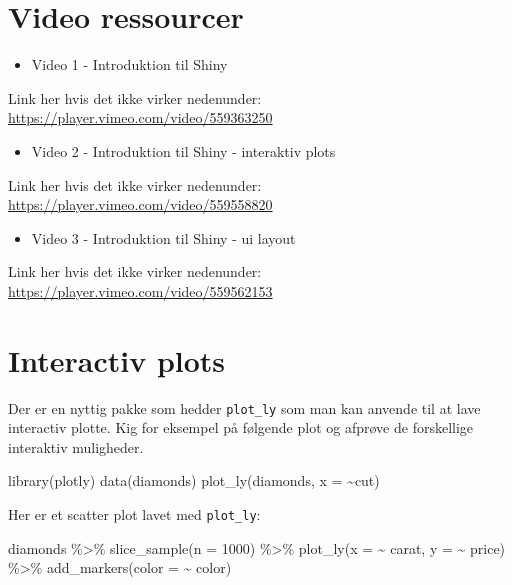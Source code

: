 \documentclass[
]{book}
\newenvironment{Shaded}{\begin{snugshade}}{\end{snugshade}}
\newcommand{\AttributeTok}[1]{\textcolor[rgb]{0.77,0.63,0.00}{#1}}
\newcommand{\DecValTok}[1]{\textcolor[rgb]{0.00,0.00,0.81}{#1}}
\newcommand{\FunctionTok}[1]{\textcolor[rgb]{0.00,0.00,0.00}{#1}}
\newcommand{\NormalTok}[1]{#1}
\newcommand{\SpecialCharTok}[1]{\textcolor[rgb]{0.00,0.00,0.00}{#1}}
\providecommand{\tightlist}{%
  \setlength{\itemsep}{0pt}\setlength{\parskip}{0pt}}
\begin{document}
\hypertarget{video-ressourcer-8}{%
\section{Video ressourcer}\label{video-ressourcer-8}}

\begin{itemize}
\tightlist
\item
  Video 1 - Introduktion til Shiny
\end{itemize}

Link her hvis det ikke virker nedenunder: \url{https://player.vimeo.com/video/559363250}

\begin{itemize}
\tightlist
\item
  Video 2 - Introduktion til Shiny - interaktiv plots
\end{itemize}

Link her hvis det ikke virker nedenunder: \url{https://player.vimeo.com/video/559558820}

\begin{itemize}
\tightlist
\item
  Video 3 - Introduktion til Shiny - ui layout
\end{itemize}

Link her hvis det ikke virker nedenunder: \url{https://player.vimeo.com/video/559562153}

\hypertarget{interactiv-plots}{%
\section{Interactiv plots}\label{interactiv-plots}}

Der er en nyttig pakke som hedder \texttt{plot\_ly} som man kan anvende til at lave interactiv plotte. Kig for eksempel på følgende plot og afprøve de forskellige interaktiv muligheder.

\begin{Shaded}
\begin{Highlighting}[]
\FunctionTok{library}\NormalTok{(plotly)}
\FunctionTok{data}\NormalTok{(diamonds)}
\FunctionTok{plot\_ly}\NormalTok{(diamonds, }
        \AttributeTok{x =} \SpecialCharTok{\textasciitilde{}}\NormalTok{cut)}
\end{Highlighting}
\end{Shaded}

Her er et scatter plot lavet med \texttt{plot\_ly}:

\begin{Shaded}
\begin{Highlighting}[]
\NormalTok{diamonds }\SpecialCharTok{\%\textgreater{}\%} \FunctionTok{slice\_sample}\NormalTok{(}\AttributeTok{n =} \DecValTok{1000}\NormalTok{) }\SpecialCharTok{\%\textgreater{}\%}
  \FunctionTok{plot\_ly}\NormalTok{(}\AttributeTok{x =} \SpecialCharTok{\textasciitilde{}}\NormalTok{ carat, }
          \AttributeTok{y =} \SpecialCharTok{\textasciitilde{}}\NormalTok{ price) }\SpecialCharTok{\%\textgreater{}\%}
  \FunctionTok{add\_markers}\NormalTok{(}\AttributeTok{color =} \SpecialCharTok{\textasciitilde{}}\NormalTok{ color)}
\end{Highlighting}
\end{Shaded}
\end{document}
